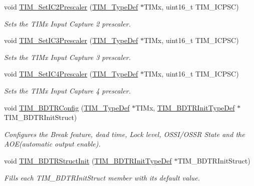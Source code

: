 \begin{DoxyCompactItemize}
void \hyperlink{group___t_i_m_ga3cc4869b5fe73271808512c89322a325}{T\+I\+M\+\_\+\+Set\+I\+C2\+Prescaler} (\hyperlink{struct_t_i_m___type_def}{T\+I\+M\+\_\+\+Type\+Def} $\ast$T\+I\+Mx, uint16\+\_\+t T\+I\+M\+\_\+\+I\+C\+P\+SC)
\begin{DoxyCompactList}\small\item\em Sets the T\+I\+Mx Input Capture 2 prescaler. \end{DoxyCompactList}\item 
void \hyperlink{group___t_i_m_ga76f906383b8132ebe00dffadb70cf7f9}{T\+I\+M\+\_\+\+Set\+I\+C3\+Prescaler} (\hyperlink{struct_t_i_m___type_def}{T\+I\+M\+\_\+\+Type\+Def} $\ast$T\+I\+Mx, uint16\+\_\+t T\+I\+M\+\_\+\+I\+C\+P\+SC)
\begin{DoxyCompactList}\small\item\em Sets the T\+I\+Mx Input Capture 3 prescaler. \end{DoxyCompactList}\item 
void \hyperlink{group___t_i_m_ga0f2c784271356d6b64b8c0da64dbdbc2}{T\+I\+M\+\_\+\+Set\+I\+C4\+Prescaler} (\hyperlink{struct_t_i_m___type_def}{T\+I\+M\+\_\+\+Type\+Def} $\ast$T\+I\+Mx, uint16\+\_\+t T\+I\+M\+\_\+\+I\+C\+P\+SC)
\begin{DoxyCompactList}\small\item\em Sets the T\+I\+Mx Input Capture 4 prescaler. \end{DoxyCompactList}\item 
void \hyperlink{group___t_i_m_ga3df4ba3f0727f63ce621e2b2e6035d4f}{T\+I\+M\+\_\+\+B\+D\+T\+R\+Config} (\hyperlink{struct_t_i_m___type_def}{T\+I\+M\+\_\+\+Type\+Def} $\ast$T\+I\+Mx, \hyperlink{struct_t_i_m___b_d_t_r_init_type_def}{T\+I\+M\+\_\+\+B\+D\+T\+R\+Init\+Type\+Def} $\ast$T\+I\+M\+\_\+\+B\+D\+T\+R\+Init\+Struct)
\begin{DoxyCompactList}\small\item\em Configures the Break feature, dead time, Lock level, O\+S\+S\+I/\+O\+S\+SR State and the A\+O\+E(automatic output enable). \end{DoxyCompactList}\item 
void \hyperlink{group___t_i_m_gaea0f49938cda8ae0738162194798afc6}{T\+I\+M\+\_\+\+B\+D\+T\+R\+Struct\+Init} (\hyperlink{struct_t_i_m___b_d_t_r_init_type_def}{T\+I\+M\+\_\+\+B\+D\+T\+R\+Init\+Type\+Def} $\ast$T\+I\+M\+\_\+\+B\+D\+T\+R\+Init\+Struct)
\begin{DoxyCompactList}\small\item\em Fills each T\+I\+M\+\_\+\+B\+D\+T\+R\+Init\+Struct member with its default value. \end{DoxyCompactList}\item 

\end{DoxyCompactItemize}
